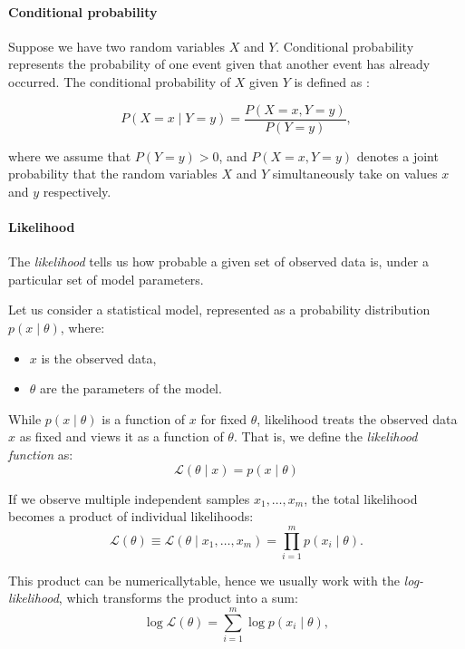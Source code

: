 \paragraph{Conditional probability}
Suppose we have two random variables $X$ and $Y$. Conditional probability represents the probability of one event given that another event has already occurred. The conditional probability of $X$ given $Y$ is defined as \cite{klenke2013probability}:

\begin{equation} 
    P(X=x \mid Y=y) = \frac{P(X=x, Y=y)}{P(Y=y)}, 
\end{equation}

where we assume that $P(Y=y) > 0$, and $P(X=x, Y=y)$ denotes a joint probability that the random variables $X$ and $Y$ simultaneously take on values $x$ and $y$ respectively.

\paragraph{Likelihood}

The \emph{likelihood} \cite{klenke2013probability} tells us how probable a given set of observed data is, under a particular set of model parameters.

Let us consider a statistical model, represented as a probability distribution $p(x \mid \theta)$, where:
\begin{itemize}
    \item $x$ is the observed data,
    \item $\theta$ are the parameters of the model.
\end{itemize}

While $p(x \mid \theta)$ is a function of $x$ for fixed $\theta$, likelihood treats the observed data $x$ as fixed and views it as a function of $\theta$. That is, we define the \emph{likelihood function} as:
\begin{equation}
    \mathcal{L}(\theta \mid x) = p(x \mid \theta)
\end{equation}

If we observe multiple independent samples $x_1, \dots, x_m$, the total likelihood becomes a product of individual likelihoods:
\begin{equation}
    \mathcal{L}(\theta) \equiv \mathcal{L}(\theta \mid x_1, \dots, x_m) = \prod_{i=1}^{m} p(x_i \mid \theta).
\end{equation}

This product can be numericallytable, hence we usually work with the \emph{log-likelihood}, which transforms the product into a sum:
\begin{equation}
    \log \mathcal{L}(\theta) = \sum_{i=1}^{m} \log p(x_i \mid \theta),
\end{equation}


